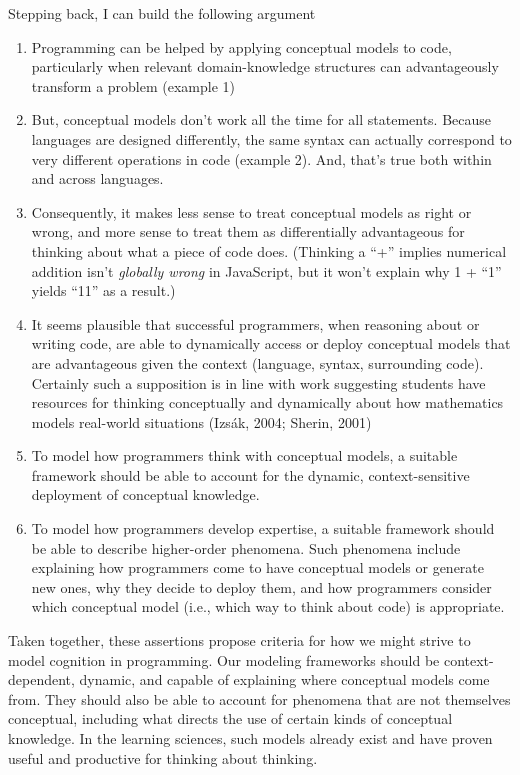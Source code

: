 Stepping back, I can build the following argument

\begin{enumerate}
\def\labelenumi{\arabic{enumi}.}
\item
  Programming can be helped by applying conceptual models to code,
  particularly when relevant domain-knowledge structures can
  advantageously transform a problem (example 1)
\item
  But, conceptual models don't work all the time for all statements.
  Because languages are designed differently, the same syntax can
  actually correspond to very different operations in code (example 2).
  And, that's true both within and across languages.
\item
  Consequently, it makes less sense to treat conceptual models as right
  or wrong, and more sense to treat them as differentially advantageous
  for thinking about what a piece of code does. (Thinking a ``+''
  implies numerical addition isn't \emph{globally wrong} in JavaScript,
  but it won't explain why 1 + ``1'' yields ``11'' as a result.)
\item
  It seems plausible that successful programmers, when reasoning about
  or writing code, are able to dynamically access or deploy conceptual
  models that are advantageous given the context (language, syntax,
  surrounding code). Certainly such a supposition is in line with work
  suggesting students have resources for thinking conceptually and
  dynamically about how mathematics models real-world situations (Izsák,
  2004; Sherin, 2001)
\item
  To model how programmers think with conceptual models, a suitable
  framework should be able to account for the dynamic, context-sensitive
  deployment of conceptual knowledge.
\item
  To model how programmers develop expertise, a suitable framework
  should be able to describe higher-order phenomena. Such phenomena
  include explaining how programmers come to have conceptual models or
  generate new ones, why they decide to deploy them, and how programmers
  consider which conceptual model (i.e., which way to think about code)
  is appropriate.
\end{enumerate}

Taken together, these assertions propose criteria for how we might
strive to model cognition in programming. Our modeling frameworks should
be context-dependent, dynamic, and capable of explaining where
conceptual models come from. They should also be able to account for
phenomena that are not themselves conceptual, including what directs the
use of certain kinds of conceptual knowledge. In the learning sciences,
such models already exist and have proven useful and productive for
thinking about thinking.

